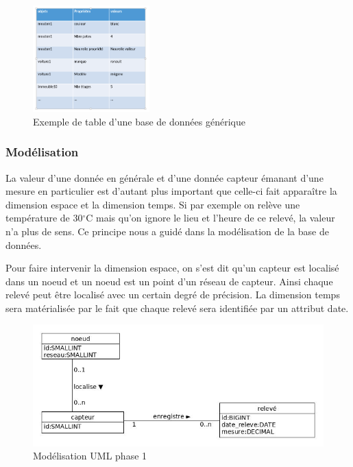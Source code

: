 \begin{figure}[h!]
    \begin{center}
         \includegraphics[width=0.4\textwidth]{images/bd_image2.png}
    \caption{Exemple de table d'une base de données générique}
    \label{fig : Exemple de table d'une base de données générique}
    \end{center}
\end{figure}


\subsubsection{Modélisation}
La valeur d'une donnée en générale et d'une donnée capteur émanant d'une mesure en particulier est d'autant plus important que celle-ci fait apparaître la dimension espace et la dimension temps. Si par exemple on relève une température de 30$^\circ$C mais qu'on ignore le lieu et l'heure de ce relevé, la valeur n'a plus de sens. Ce principe nous a guidé dans la modélisation de la base de données.

Pour faire intervenir la dimension espace, on s'est dit qu'un capteur est localisé dans un noeud et un noeud est un point d'un réseau de capteur. Ainsi chaque relevé peut être localisé avec un certain degré de précision.
La dimension temps sera matérialisée par le fait que chaque relevé sera identifiée par un attribut date. 
\begin{figure}[!h]
    \begin{center}
         \includegraphics[width=1\textwidth]{images/uml_image1.jpg}
    \caption{ Modélisation UML phase 1}
    \label{fig : Modélisation UML phase 1}
    \end{center}
\end{figure}

